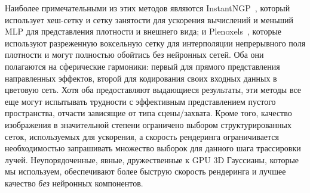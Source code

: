 Наиболее примечательными из этих методов являются InstantNGP~\cite{mueller2022instant}, который использует хеш-сетку и сетку занятости для ускорения вычислений и меньший MLP для представления плотности и внешнего вида;
и Plenoxels~\cite{plenoxels}, которые используют разреженную воксельную сетку для интерполяции непрерывного поля плотности и могут полностью обойтись без нейронных сетей. 
{Оба они полагаются на сферические гармоники: первый для прямого представления направленных эффектов, второй для кодирования своих входных данных в цветовую сеть.}
Хотя оба предоставляют выдающиеся результаты, эти методы все еще могут испытывать трудности с эффективным представлением пустого пространства, отчасти зависящие от типа сцены/захвата. Кроме того, качество изображения в значительной степени ограничено выбором структурированных сеток, используемых для ускорения, а скорость рендеринга ограничивается необходимостью запрашивать множество выборок для данного шага трассировки лучей. Неупорядоченные, явные, дружественные к GPU 3D Гауссианы, которые мы используем, обеспечивают более быструю скорость рендеринга и лучшее качество \emph{без} нейронных компонентов.
